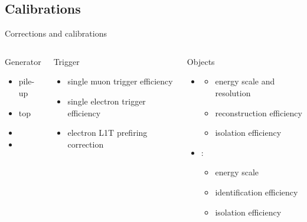 \subsection{Calibrations}

\begin{frame}{Corrections and calibrations}
\smaller
    \begin{columns}

        \begin{block}{Generator}
            \begin{itemize}
                \item pile-up
                \item top \pt
                \item \PZ \pt
                \item \WW \pt
            \end{itemize}
        \end{block}
        
        \begin{block}{Trigger}
            \begin{itemize}
                \item single muon trigger efficiency
                \item \alert{single electron trigger efficiency}
                \item electron L1T prefiring correction
            \end{itemize}
        \end{block}
        
        
        \begin{block}{Objects}
            \begin{itemize}
                \item \Pe
                \begin{itemize}
                \smaller
                    \item energy scale and resolution
                    \item reconstruction efficiency
                    \item isolation efficiency
                \end{itemize}
                \item \PGm: 
                \begin{itemize}
                \smaller
                    \item energy scale
                    \item identification efficiency
                    \item isolation efficiency
                \end{itemize}
                

\end{itemize}
\end{block}
\end{columns}
\end{frame}
